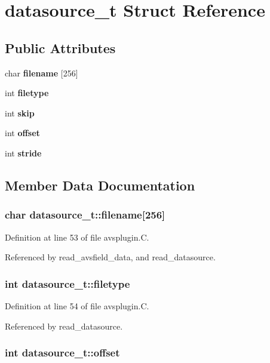 \section{datasource\_\-t  Struct Reference}
\label{structdatasource__t}
\subsection*{Public Attributes}
\begin{CompactItemize}
\item 
char {\bf filename} [256]
\item 
int {\bf filetype}
\item 
int {\bf skip}
\item 
int {\bf offset}
\item 
int {\bf stride}
\end{CompactItemize}


\subsection{Member Data Documentation}
\subsubsection{\setlength{\rightskip}{0pt plus 5cm}char datasource\_\-t::filename[256]}\label{structdatasource__t_m0}




Definition at line 53 of file avsplugin.C.

Referenced by read\_\-avsfield\_\-data, and read\_\-datasource.
\subsubsection{\setlength{\rightskip}{0pt plus 5cm}int datasource\_\-t::filetype}\label{structdatasource__t_m1}




Definition at line 54 of file avsplugin.C.

Referenced by read\_\-datasource.
\subsubsection{\setlength{\rightskip}{0pt plus 5cm}int datasource\_\-t::offset}\label{structdatasource__t_m3}




